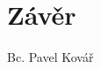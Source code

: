 \section{Závěr}
\label{sec:Conclusion}

\bigskip
\begin{flushright}
Bc. Pavel Kovář
\end{flushright}